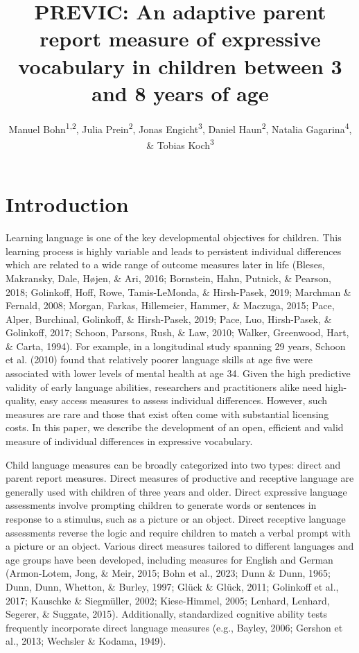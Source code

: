 \documentclass[
  man,floatsintext]{apa6}
\title{PREVIC: An adaptive parent report measure of expressive vocabulary in children between 3 and 8 years of age}
\author{Manuel Bohn\textsuperscript{1,2}, Julia Prein\textsuperscript{2}, Jonas Engicht\textsuperscript{3}, Daniel Haun\textsuperscript{2}, Natalia Gagarina\textsuperscript{4}, \& Tobias Koch\textsuperscript{3}}
\date{}
\affiliation{\vspace{0.5cm}\textsuperscript{1} Institute for Psychology, Leuphana University Lüneburg, Germany\\\textsuperscript{2} Department of Comparative Cultural Psychology, Max Planck Institute for Evolutionary Anthropology, Leipzig, Germany\\\textsuperscript{3} Institute of Psychology, Friedrich-Schiller-University Jena, Germany\\\textsuperscript{4} Leibniz-Zentrum Allgemeine Sprachwissenschaft, Berlin, Germany}
\begin{document}
\maketitle

\hypertarget{introduction}{%
\section{Introduction}\label{introduction}}

Learning language is one of the key developmental objectives for children. This learning process is highly variable and leads to persistent individual differences which are related to a wide range of outcome measures later in life (Bleses, Makransky, Dale, Højen, \& Ari, 2016; Bornstein, Hahn, Putnick, \& Pearson, 2018; Golinkoff, Hoff, Rowe, Tamis-LeMonda, \& Hirsh-Pasek, 2019; Marchman \& Fernald, 2008; Morgan, Farkas, Hillemeier, Hammer, \& Maczuga, 2015; Pace, Alper, Burchinal, Golinkoff, \& Hirsh-Pasek, 2019; Pace, Luo, Hirsh-Pasek, \& Golinkoff, 2017; Schoon, Parsons, Rush, \& Law, 2010; Walker, Greenwood, Hart, \& Carta, 1994). For example, in a longitudinal study spanning 29 years, Schoon et al. (2010) found that relatively poorer language skills at age five were associated with lower levels of mental health at age 34. Given the high predictive validity of early language abilities, researchers and practitioners alike need high-quality, easy access measures to assess individual differences. However, such measures are rare and those that exist often come with substantial licensing costs. In this paper, we describe the development of an open, efficient and valid measure of individual differences in expressive vocabulary.

Child language measures can be broadly categorized into two types: direct and parent report measures. Direct measures of productive and receptive language are generally used with children of three years and older. Direct expressive language assessments involve prompting children to generate words or sentences in response to a stimulus, such as a picture or an object. Direct receptive language assessments reverse the logic and require children to match a verbal prompt with a picture or an object. Various direct measures tailored to different languages and age groups have been developed, including measures for English and German (Armon-Lotem, Jong, \& Meir, 2015; Bohn et al., 2023; Dunn \& Dunn, 1965; Dunn, Dunn, Whetton, \& Burley, 1997; Glück \& Glück, 2011; Golinkoff et al., 2017; Kauschke \& Siegmüller, 2002; Kiese-Himmel, 2005; Lenhard, Lenhard, Segerer, \& Suggate, 2015). Additionally, standardized cognitive ability tests frequently incorporate direct language measures (e.g., Bayley, 2006; Gershon et al., 2013; Wechsler \& Kodama, 1949).
\end{document}
